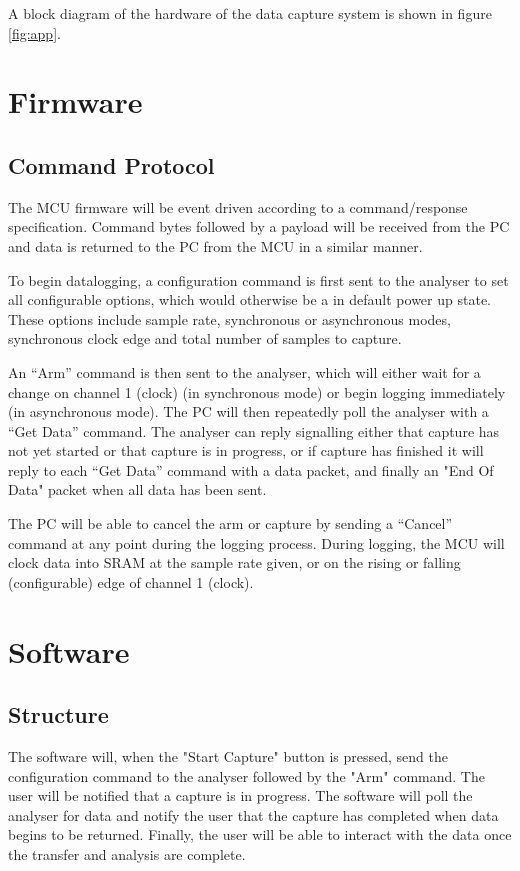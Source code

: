 \documentclass[11pt]{article}
\begin{document}
    A block diagram of the hardware of the data capture system is shown in figure \ref{fig:app}.
    
\section{Firmware}
\subsection{Command Protocol}
    The MCU firmware will be event driven according to a command/response
    specification. Command bytes followed by a payload will be received from the
    PC and data is returned to the PC from the MCU in a similar manner.
    
    To begin datalogging, a configuration command is first sent to the analyser
    to set all configurable options, which would otherwise be a in default power
    up state. These options include sample rate, synchronous or asynchronous
    modes, synchronous clock edge and total number of samples to capture.

    An ``Arm'' command is then sent to the analyser, which will either wait
    for a change on channel 1 (clock) (in synchronous mode) or begin logging
    immediately (in asynchronous mode). The PC will then repeatedly poll the
    analyser with a ``Get Data'' command.  The analyser can reply signalling either
    that capture has not yet started or that capture is in progress, or if capture
    has finished it will reply to each ``Get Data'' command with a data packet, and
    finally an "End Of Data" packet when all data has been sent.
    
    The PC will be able to cancel the arm or capture by sending a ``Cancel''
    command at any point during the logging process. During
    logging, the MCU will clock data into SRAM at the sample rate given, or on
    the rising or falling (configurable) edge of channel 1 (clock).


\section{Software}
\subsection{Structure}

The software will, when the "Start Capture" button is pressed, send the
    configuration command to the analyser followed by the "Arm" command.  The
    user will be notified that a capture is in progress.  The software will poll
    the analyser for data and notify the user that the capture has completed when
    data begins to be returned.  Finally, the user will be able to interact with
    the data once the transfer and analysis are complete.
\end{document}
